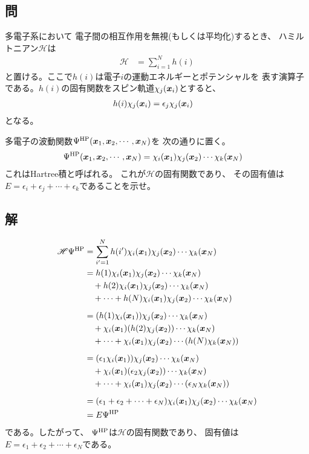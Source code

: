\subsection{問}
多電子系において
電子間の相互作用を無視(もしくは平均化)するとき、
ハミルトニアン$\mathscr{H}$は
\begin{align}
	\mathscr{H}
&=
	\sum_{i=1}^N h(i)
\end{align}
と置ける。ここで$h(i)$は電子$i$の運動エネルギーとポテンシャルを
表す演算子である。$h(i)$の固有関数をスピン軌道$\chi_j({\bm{x}}_i)$とすると、
\begin{align}
	h(i) \chi_j({\bm{x}}_i)
&=
	\epsilon_j \chi_j({\bm{x}}_i)
\end{align}
となる。

多電子の波動関数$\Psi^{\rm HP}({\bm{x}}_1,{\bm{x}}_2,\cdots,{\bm{x}}_N)$を
次の通りに置く。
\begin{align}
	\Psi^{\rm HP}({\bm{x}}_1,{\bm{x}}_2,\cdots,{\bm{x}}_N)
&=
	\chi_i({\bm{x}}_1)\chi_j({\bm{x}}_2)\cdots\chi_k({\bm{x}}_N)
\end{align}
これはHartree積と呼ばれる。
これが$\mathscr{H}$の固有関数であり、
その固有値は$E=\epsilon_i+\epsilon_j+\cdots+\epsilon_k$であることを示せ。

\subsection{解}
\begin{align}
	\mathscr{H}\Psi^{\rm HP}
&=
	\sum_{i'=1}^N
		h(i') \chi_i(\x_1) \chi_j(\x_2) \cdots \chi_k(\x_N) \\
%
%
&=
	h(1) \chi_i(\x_1) \chi_j(\x_2) \cdots \chi_k(\x_N) \nonumber\\&\quad
	+
	h(2) \chi_i(\x_1) \chi_j(\x_2) \cdots \chi_k(\x_N) \nonumber\\&\quad
	+
	\cdots
	+
	h(N) \chi_i(\x_1) \chi_j(\x_2) \cdots \chi_k(\x_N) \\[2mm]
%
%
&=
	(h(1) \chi_i(\x_1)) \chi_j(\x_2) \cdots \chi_k(\x_N) \nonumber\\&\quad
	+
	\chi_i(\x_1) (h(2)\chi_j(\x_2)) \cdots \chi_k(\x_N) \nonumber\\&\quad
	+
	\cdots
	+
	\chi_i(\x_1) \chi_j(\x_2) \cdots (h(N)\chi_k(\x_N)) \\[2mm]
%
%
&=
	(\epsilon_1 \chi_i(\x_1)) \chi_j(\x_2) \cdots \chi_k(\x_N) \nonumber\\&\quad
	+
	\chi_i(\x_1) (\epsilon_2\chi_j(\x_2)) \cdots \chi_k(\x_N) \nonumber\\&\quad
	+
	\cdots
	+
	\chi_i(\x_1) \chi_j(\x_2) \cdots (\epsilon_N\chi_k(\x_N)) \\[2mm]
%
%
&=
	(\epsilon_1+\epsilon_2+\cdots+\epsilon_N)
		\chi_i(\x_1)\chi_j(\x_2)\cdots\chi_k(\x_N) \\
%
%
&=
	E \Psi^{\rm HP}
\end{align}
である。したがって、
$\Psi^{\rm HP}$は$\mathscr{H}$の固有関数であり、
固有値は$E=\epsilon_1+\epsilon_2+\cdots+\epsilon_N$である。

